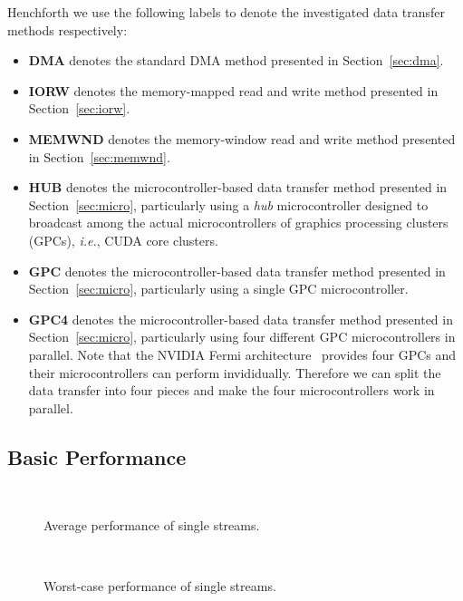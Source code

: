 Henchforth we use the following labels to denote the investigated data
transfer methods respectively:
\begin{itemize}
 \item \textbf{DMA} denotes the standard DMA method presented in
       Section~\ref{sec:dma}.
 \item \textbf{IORW} denotes the memory-mapped read and write method
       presented in Section~\ref{sec:iorw}.
 \item \textbf{MEMWND} denotes the memory-window read and write method
       presented in Section~\ref{sec:memwnd}.
 \item \textbf{HUB} denotes the microcontroller-based data transfer
       method presented in Section~\ref{sec:micro}, particularly using a
       \textit{hub} microcontroller designed to broadcast among the
       actual microcontrollers of graphics processing clusters (GPCs),
       \textit{i.e.}, CUDA core clusters.
 \item \textbf{GPC} denotes the microcontroller-based data transfer
       method presented in Section~\ref{sec:micro}, particularly using a
       single GPC microcontroller.
 \item \textbf{GPC4} denotes the microcontroller-based data transfer
       method presented in Section~\ref{sec:micro}, particularly using
       four different GPC microcontrollers in parallel.
       Note that the NVIDIA Fermi architecture~\cite{NVIDIA_Fermi}
       provides four GPCs and their microcontrollers can perform
       invididually.
       Therefore we can split the data transfer into four pieces and
       make the four microcontrollers work in parallel.
\end{itemize}

\subsection{Basic Performance}

\begin{figure}[!t]
 \begin{center}
  \\
  \caption{Average performance of single streams.}
  \label{fig:average_transfer_real-time}
 \end{center}
 \vspace{0.5em}
 \begin{center}
  \\
  \caption{Worst-case performance of single streams.}
  \label{fig:worst_case_transfer_real-time}
 \end{center}
\end{figure}

